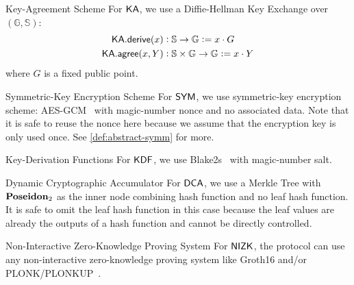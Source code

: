 \begin{definitiontoc}{Key-Agreement Scheme}
    For ${\textsf{KA}}$, we use a Diffie-Hellman Key Exchange over $(\mathbb{G}, \mathbb{S})$:
    \begin{align*}
        {\textsf{KA}}.{\textsf{derive}}(x)   &: \mathbb{S} \to \mathbb{G}                   := x \cdot G \\
        {\textsf{KA}}.{\textsf{agree}}(x, Y) &: \mathbb{S} \times \mathbb{G} \to \mathbb{G} := x \cdot Y
    \end{align*}
    where $G$ is a fixed public point.
\end{definitiontoc}

\begin{definitiontoc}{Symmetric-Key Encryption Scheme}
    For ${\textsf{SYM}}$, we use symmetric-key encryption scheme: AES-GCM~\cite{rfc5288} with magic-number nonce and no associated data. Note that it is safe to reuse the nonce here because we assume that the encryption key is only used once. See \autoref{def:abstract-symm} for more.
\end{definitiontoc}

\begin{definitiontoc}{Key-Derivation Functions}
    For ${\textsf{KDF}}$, we use Blake2s~\cite{rfc7693} with magic-number salt.
\end{definitiontoc}

\begin{definitiontoc}{Dynamic Cryptographic Accumulator}
    For ${\textsf{DCA}}$, we use a Merkle Tree with ${\textbf{Poseidon}}_2$ as the inner node combining hash function and no leaf hash function. It is safe to omit the leaf hash function in this case because the leaf values are already the outputs of a hash function and cannot be directly controlled.
\end{definitiontoc}

\begin{definitiontoc}{Non-Interactive Zero-Knowledge Proving System} \label{def:concrete-zkp}
    For ${\textsf{NIZK}}$, the protocol can use any non-interactive zero-knowledge proving system like Groth16 \cite{KRRS21USENIX} and/or PLONK/PLONKUP~\cite{plonk,plonkup}. 
\end{definitiontoc}

